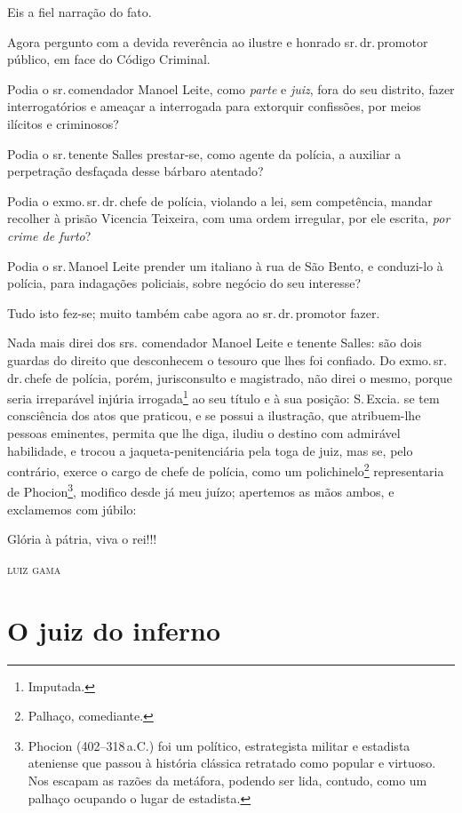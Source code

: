 Eis a fiel narração do fato.

Agora pergunto com a devida reverência ao ilustre e honrado sr.\,dr.\,promotor público, em face do Código Criminal.

Podia o sr.\,comendador Manoel Leite, como \emph{parte} e \emph{juiz},
fora do seu distrito, fazer interrogatórios e ameaçar a interrogada para
extorquir confissões, por meios ilícitos e criminosos?

Podia o sr.\,tenente Salles prestar-se, como agente da polícia, a
auxiliar a perpetração desfaçada desse bárbaro atentado?

Podia o exmo.\,sr.\,dr.\,chefe de polícia, violando a lei, sem competência,
mandar recolher à prisão Vicencia Teixeira, com uma ordem irregular, por
ele escrita, \emph{por crime de furto}?

Podia o sr.\,Manoel Leite prender um italiano à rua de São Bento, e
conduzi-lo à polícia, para indagações policiais, sobre negócio do seu
interesse?

Tudo isto fez-se; muito também cabe agora ao sr.\,dr.\,promotor fazer.

Nada mais direi dos srs. comendador Manoel Leite e tenente Salles: são
dois guardas do direito que desconhecem o tesouro que lhes foi confiado.
Do exmo.\,sr.\,dr.\,chefe de polícia, porém, jurisconsulto e magistrado,
não direi o mesmo, porque seria irreparável injúria irrogada\footnote{
  Imputada.} ao seu título e à sua posição: S.\,Excia. se tem consciência
dos atos que praticou, e se possui a ilustração, que atribuem-lhe
pessoas eminentes, permita que lhe diga, iludiu o destino com admirável
habilidade, e trocou a jaqueta-penitenciária pela toga de juiz, mas se,
pelo contrário, exerce o cargo de chefe de polícia, como um
polichinelo\footnote{ Palhaço, comediante.} representaria de
Phocion\footnote{ Phocion (402--318\,a.C.) foi um político,
  estrategista militar e estadista ateniense que passou à história
  clássica retratado como popular e virtuoso. Nos escapam as razões da
  metáfora, podendo ser lida, contudo, como um palhaço ocupando o lugar
  de estadista.}, modifico desde já meu juízo; apertemos as mãos ambos,
e exclamemos com júbilo:

Glória à pátria, viva o rei!!!

\begin{flushright}
\textsc{luiz gama}
\end{flushright}


\part{O juiz do inferno}

